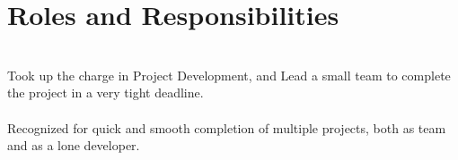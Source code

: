 \documentclass[]{deedy-resume-openfont}
\begin{document}
\section{Roles and Responsibilities}
  \\
Took up the charge in Project Development, and Lead a small team to complete the project in a very tight deadline.\\
\sectionsep
{}  \\
Recognized for quick and smooth completion of multiple projects, both as team and as a lone developer.\\
\sectionsep
\ 
\end{document}
